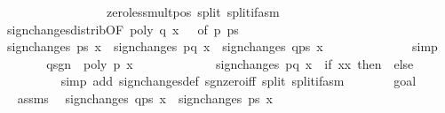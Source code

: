 \begin{isabellebody}
\ \ \ \ \ \ \ \ \ \ \ \ \ \ \ \ \ zero{\isacharunderscore}less{\isacharunderscore}mult{\isacharunderscore}pos{\isacharprime}\ split{\isacharcolon}\ split{\isacharunderscore}if{\isacharunderscore}asm{\isacharparenright}\isanewline
\ \ \ \ \ \isamarkupfalse%
\ sign{\isacharunderscore}changes{\isacharunderscore}distrib{\isacharbrackleft}OF\ {\isacharbackquoteopen}poly\ q\ x\ {\isasymnoteq}\ {}{\isacharbackquoteclose}{\isacharcomma}\ of\ {\isachardoublequoteopen}{\isacharbrackleft}p{\isacharbrackright}{\isachardoublequoteclose}\ ps{\isacharprime}{\isacharbrackright}\isanewline
\ \ \ \ \ \ \ \ \isamarkupfalse%
\ {\isachardoublequoteopen}sign{\isacharunderscore}changes\ ps\ x\ {\isacharequal}\ sign{\isacharunderscore}changes\ {\isacharbrackleft}p{\isacharcomma}q{\isacharbrackright}\ x\ {\isacharplus}\ sign{\isacharunderscore}changes\ {\isacharparenleft}q{\isacharhash}ps{\isacharprime}{\isacharparenright}\ x{\isachardoublequoteclose}\isanewline
\ \ \ \ \ \ \ \ \ \ \ \ \isamarkupfalse%
\ simp\isanewline
\ \ \ \ \isamarkupfalse%
\ \isamarkupfalse%
\ q{\isacharunderscore}sgn\ \ {\isacharbackquoteopen}poly\ p\ x\ {\isasymnoteq}\ {}{\isacharbackquoteclose}\ \isanewline
\ \ \ \ \ \ \ \ \isamarkupfalse%
\ {\isachardoublequoteopen}sign{\isacharunderscore}changes\ {\isacharbrackleft}p{\isacharcomma}q{\isacharbrackright}\ x\ {\isacharequal}\ {\isacharparenleft}if\ x{\isacharless}x\ then\ {}\ else\ {}{\isacharparenright}{\isachardoublequoteclose}\isanewline
\ \ \ \ \ \ \ \ \isamarkupfalse%
\ {\isacharparenleft}simp\ add{\isacharcolon}\ sign{\isacharunderscore}changes{\isacharunderscore}def\ sgn{\isacharunderscore}zero{\isacharunderscore}iff\ split{\isacharcolon}\ split{\isacharunderscore}if{\isacharunderscore}asm{\isacharparenright}\isanewline
\ \ \ \ \isamarkupfalse%
\ \isamarkupfalse%
\ goal{}{\isacharparenleft}{}{\isacharparenright}\isanewline
\ \ \ \ \isamarkupfalse%
\ \isamarkupfalse%
\ assms{\isacharparenleft}{}{\isacharparenright}\ \isamarkupfalse%
\ {\isachardoublequoteopen}sign{\isacharunderscore}changes\ {\isacharparenleft}q{\isacharhash}ps{\isacharprime}{\isacharparenright}\ x\ {\isacharequal}\ sign{\isacharunderscore}changes\ ps\ x\isanewline
\ \ \ \ \ \ \ \ \isamarkupfalse%

\end{isabellebody}
